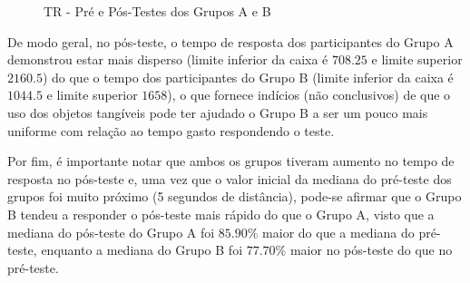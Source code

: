 \begin{figure}[htb]
	\centering
	\captionsetup{justification=centering}
	\caption{TR - Pré e Pós-Testes dos Grupos A e B}
	\label{fig:F1_TR_H02}
\end{figure}

De modo geral, no pós-teste, o tempo de resposta dos participantes do Grupo A demonstrou estar mais disperso (limite inferior da caixa é $708.25$ e limite superior $2160.5$) do que o tempo dos participantes do Grupo B (limite inferior da caixa é $1044.5$ e limite superior $1658$), o que fornece indícios (não conclusivos) de que o uso dos objetos tangíveis pode ter ajudado o Grupo B a ser um pouco mais uniforme com relação ao tempo gasto respondendo o teste.

Por fim, é importante notar que ambos os grupos tiveram aumento no tempo de resposta no pós-teste e, uma vez que o valor inicial da mediana do pré-teste dos grupos foi muito próximo (5 segundos de distância), pode-se afirmar que o Grupo B tendeu a responder o pós-teste mais rápido do que o Grupo A, visto que a mediana do pós-teste do Grupo A foi $85.90\%$ maior do que a mediana do pré-teste, enquanto a mediana do Grupo B foi $77.70\%$ maior no pós-teste do que no pré-teste.

